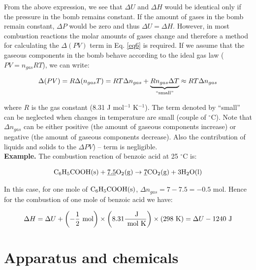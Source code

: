 \documentclass[byrevtex,amssymb,aps,pra,floatfix,letterpaper]{revtex4}
\newcommand{\degree}[0]{$^\circ$}
\begin{document}
From the above expression, we see that $\Delta U$ and $\Delta H$ would be identical only if the pressure in the bomb remains constant. If the amount of gases in the bomb remain constant, $\Delta P$ would be zero and thus $\Delta U = \Delta H$. However, in most combustion reactions the molar amounts of gases change and therefore a method for calculating the $\Delta(PV)$ term in Eq. \ref{eq6} is required. If we assume that the gaseous components in the bomb behave according to the ideal gas law ($PV = n_{gas}RT$), we can write:

\begin{equation}
\label{eq7}
\Delta (PV) = R\Delta (n_{gas}T) = RT\Delta n_{gas} + 
\underbrace{Rn_{gas}\Delta T}_{\textnormal{``small''}} \approx RT\Delta n_{gas}
\end{equation}

\noindent
where $R$ is the gas constant (8.31 J mol$^{-1}$ K$^{-1}$). The term denoted by ``small'' can be neglected when changes in temperature are small (couple of \degree C). Note that $\Delta n_{gas}$ can be either positive (the amount of gaseous components increase) or negative (the amount of gaseous components decrease). 
Also the contribution of liquids and solids to the $\Delta PV$) -- term is negligible.\\

\noindent
\textbf{Example.} The combustion reaction of benzoic acid at 25 \degree C is:

\begin{equation}
\label{eq8}
\textnormal{C}_6\textnormal{H}_5\textnormal{COOH(s)} + \underline{7.5}
\textnormal{O}_2\textnormal{(g)} \rightarrow\underline{7}\textnormal{CO}_2
\textnormal{(g)} + 3\textnormal{H}_2\textnormal{O(l)}
\end{equation}

\noindent
In this case, for one mole of $\textnormal{C}_6\textnormal{H}_5\textnormal{COOH(s)}$, $\Delta n_{gas} = 7 - 7.5 = -0.5$ mol. Hence for the combustion of one mole of benzoic acid we have:

\begin{equation}
\label{eq9}
\Delta H = \Delta U + \left( -\frac{1}{2} \textnormal{ mol}\right)
\times \left( 8.31 \frac{\textnormal{ J}}{\textnormal{ mol K}}\right)
\times \left( 298 \textnormal{ K}\right) = \Delta U - 1240 \textnormal{ J}
\end{equation}

\section{Apparatus and chemicals}
\end{document}
